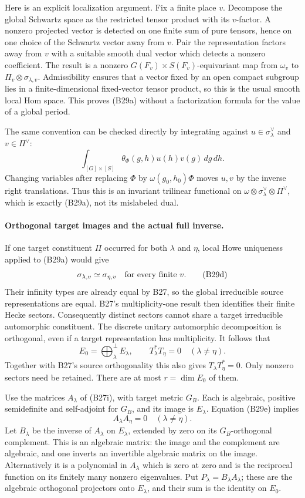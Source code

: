 Here is an explicit localization argument.  Fix a
finite place $v$.  Decompose the global Schwartz space
as the restricted tensor product with its $v$-factor.
A nonzero projected vector is detected on one finite
sum of pure tensors, hence on one choice of the
Schwartz vector away from $v$.  Pair the representation
factors away from $v$ with a suitable smooth dual
vector which detects a nonzero coefficient.  The
result is a nonzero $G(F_v)\times S(F_v)$-equivariant
map from $\omega_v$ to $\Pi_v\otimes
\sigma_{\lambda,v}$.  Admissibility ensures that a
vector fixed by an open compact subgroup lies in a
finite-dimensional fixed-vector tensor product, so
this is the usual smooth local Hom space.  This
proves (B29a) without a factorization formula for
the value of a global period.

The same convention can be checked directly by
integrating against $u\in\sigma_\lambda^\vee$ and
$v\in\Pi^\vee$:
\[
 \int_{[G]\times[S]}\theta_\Phi(g,h)u(h)v(g)\,dg\,dh.
 \tag{B29c}
\]
Changing variables after replacing $\Phi$ by
$\omega(g_0,h_0)\Phi$ moves $u,v$ by the inverse
right translations.  Thus this is an invariant
trilinear functional on
$\omega\otimes\sigma_\lambda^\vee\otimes\Pi^\vee$,
which is exactly (B29a), not its mislabeled dual.

\paragraph{Orthogonal target images and the actual full inverse.}
If one target constituent $\Pi$ occurred for both
$\lambda$ and $\eta$, local Howe uniqueness applied
to (B29a) would give
\[
             \sigma_{\lambda,v}\simeq
                   \sigma_{\eta,v}
                   \quad\hbox{for every finite }v.
 \tag{B29d}
\]
Their infinity types are already equal by B27, so the
global irreducible source representations are equal.
B27's multiplicity-one result then identifies their
finite Hecke sectors.  Consequently distinct sectors
cannot share a target irreducible automorphic
constituent.  The discrete unitary automorphic
decomposition is orthogonal, even if a target
representation has multiplicity.  It follows that
\[
 E_0=\mathop{\bigoplus}^{\perp}_{\lambda}E_\lambda,
       \qquad T_\lambda^*T_\eta=0
                       \quad(\lambda\ne\eta).
 \tag{B29e}
\]
Together with B27's source orthogonality this also
gives $T_\lambda T_\eta^*=0$.
Only nonzero sectors need be retained.  There are
at most $r=\dim E_0$ of them.

Use the matrices $A_\lambda$ of (B27i), with target
metric $G_B$.  Each is algebraic, positive
semidefinite and self-adjoint for $G_B$, and its
image is $E_\lambda$.  Equation (B29e) implies
\[
           A_\lambda A_\eta=0\quad(\lambda\ne\eta).
 \tag{B29f}
\]
Let $B_\lambda$ be the inverse of $A_\lambda$ on
$E_\lambda$, extended by zero on its $G_B$-orthogonal
complement.  This is an algebraic matrix: the image
and the complement are algebraic, and one inverts
an invertible algebraic matrix on the image.
Alternatively it is a polynomial in $A_\lambda$
which is zero at zero and is the reciprocal function
on its finitely many nonzero eigenvalues.
Put $P_\lambda=B_\lambda A_\lambda$; these are the
algebraic orthogonal projectors onto $E_\lambda$,
and their sum is the identity on $E_0$.

